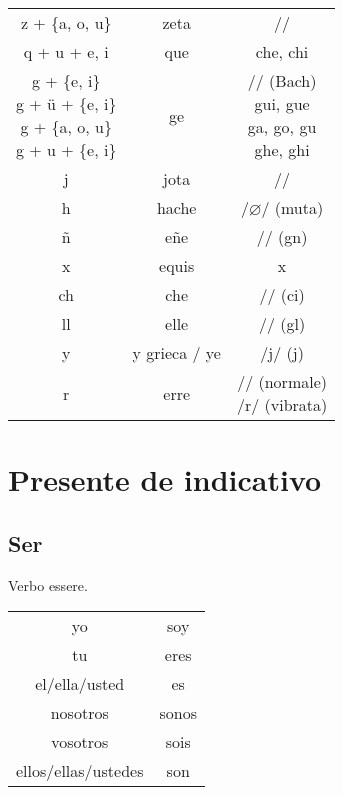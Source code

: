 \documentclass[12pt]{extarticle}
\begin{document}
\begin{multicols}{2}
\begin{center}
\begin{tabular}{|c|c|c|}
			z + \{a, o, u\} & zeta            & /\texttheta/                         \\
			q + u + {e, i}  & que             & che, chi                             \\
			\makecell{g + \{e, i\}                                                   \\ g + ü + \{e, i\} \\ g + \{a, o, u\} \\ g + u + \{e, i\}} & ge & \makecell{/\textchi/ (Bach) \\ gui, gue \\ ga, go, gu \\ ghe, ghi} \\
			j               & jota            & /\textchi/                           \\
			h               & hache           & /$\varnothing$/ (muta)               \\
			ñ               & eñe             & /\textltailn/ (gn)                   \\
			x               & equis           & x                                    \\
			ch              & che             & /\textteshlig/ (ci)                  \\
			ll              & elle            & /\textlambda/ (gl)                   \\
			y               & y grieca / ye   & /j/ (j)                              \\
			r               & erre            & \makecell{/\textfishhookr/ (normale) \\ /r/ (vibrata)} \\
			\hline
		\end{tabular}
	\end{center}
\end{multicols}

\section{Presente de indicativo}

\subsection{Ser}
Verbo essere.

\begin{tabular}{|c|c|}
	\hline
	yo                  & soy   \\
	tu                  & eres  \\
	el/ella/usted       & es    \\
	nosotros            & sonos \\
	vosotros            & sois  \\
	ellos/ellas/ustedes & son   \\
	\hline
\end{tabular}
\end{document}
